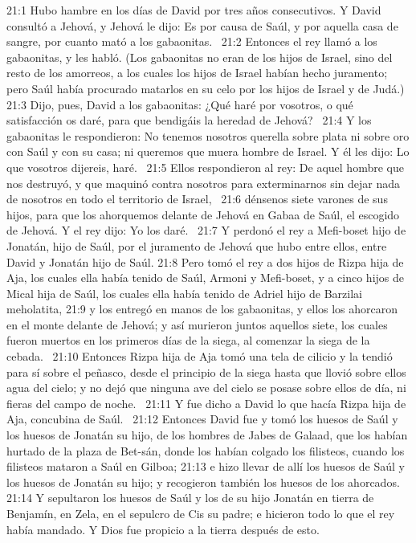 21:1 Hubo hambre en los días de David por tres años consecutivos. Y David consultó a Jehová, y Jehová le dijo: Es por causa de Saúl, y por aquella casa de sangre, por cuanto mató a los gabaonitas.  
21:2 Entonces el rey llamó a los gabaonitas, y les habló. (Los gabaonitas no eran de los hijos de Israel, sino del resto de los amorreos, a los cuales los hijos de Israel habían hecho juramento; pero Saúl había procurado matarlos en su celo por los hijos de Israel y de Judá.)  
21:3 Dijo, pues, David a los gabaonitas: ¿Qué haré por vosotros, o qué satisfacción os daré, para que bendigáis la heredad de Jehová?  
21:4 Y los gabaonitas le respondieron: No tenemos nosotros querella sobre plata ni sobre oro con Saúl y con su casa; ni queremos que muera hombre de Israel. Y él les dijo: Lo que vosotros dijereis, haré.  
21:5 Ellos respondieron al rey: De aquel hombre que nos destruyó, y que maquinó contra nosotros para exterminarnos sin dejar nada de nosotros en todo el territorio de Israel,  
21:6 dénsenos siete varones de sus hijos, para que los ahorquemos delante de Jehová en Gabaa de Saúl, el escogido de Jehová. Y el rey dijo: Yo los daré.  
21:7 Y perdonó el rey a Mefi-boset hijo de Jonatán, hijo de Saúl, por el juramento de Jehová que hubo entre ellos, entre David y Jonatán hijo de Saúl. 
21:8 Pero tomó el rey a dos hijos de Rizpa hija de Aja, los cuales ella había tenido de Saúl, Armoni y Mefi-boset, y a cinco hijos de Mical hija de Saúl, los cuales ella había tenido de Adriel hijo de Barzilai meholatita, 
21:9 y los entregó en manos de los gabaonitas, y ellos los ahorcaron en el monte delante de Jehová; y así murieron juntos aquellos siete, los cuales fueron muertos en los primeros días de la siega, al comenzar la siega de la cebada.  
21:10 Entonces Rizpa hija de Aja tomó una tela de cilicio y la tendió para sí sobre el peñasco, desde el principio de la siega hasta que llovió sobre ellos agua del cielo; y no dejó que ninguna ave del cielo se posase sobre ellos de día, ni fieras del campo de noche.  
21:11 Y fue dicho a David lo que hacía Rizpa hija de Aja, concubina de Saúl.  
21:12 Entonces David fue y tomó los huesos de Saúl y los huesos de Jonatán su hijo, de los hombres de Jabes de Galaad, que los habían hurtado de la plaza de Bet-sán, donde los habían colgado los filisteos, cuando los filisteos mataron a Saúl en Gilboa; 
21:13 e hizo llevar de allí los huesos de Saúl y los huesos de Jonatán su hijo; y recogieron también los huesos de los ahorcados.  
21:14 Y sepultaron los huesos de Saúl y los de su hijo Jonatán en tierra de Benjamín, en Zela, en el sepulcro de Cis su padre; e hicieron todo lo que el rey había mandado. Y Dios fue propicio a la tierra después de esto.  
